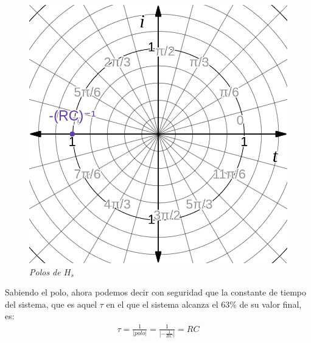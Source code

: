 \documentclass[12pt,a4paper]{report}
\begin{document}
\begin{enumerate}[label=\alph*)]
      \noindent
      \begin{figure}[h]
        \centering
        \begin{minipage}[h]{0.4\textwidth}
          \centering
          \includegraphics[width=1\textwidth]{./images/ej4.4.png}
          \textit{Polos de $H_s$}
        \end{minipage}
      \end{figure}

      Sabiendo el polo, ahora podemos decir con seguridad que la constante de tiempo del sistema, que es aquel $\tau$ 
      en el que el sistema alcanza el 63\% de su valor final, es:
      \begin{gather*}
        \tau = \frac{1}{|polo|} = \frac{1}{|-\frac{1}{RC}|} = RC
      \end{gather*}


\end{enumerate}
\end{document}

